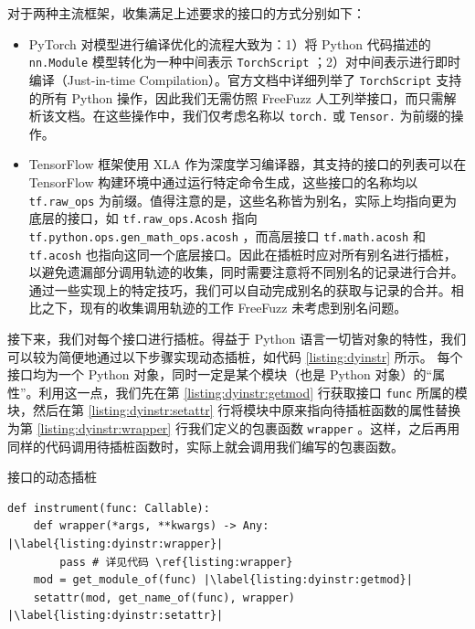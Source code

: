 对于两种主流框架，收集满足上述要求的接口的方式分别如下：
\begin{itemize}
    \item PyTorch 对模型进行编译优化的流程大致为：1）将 Python 代码描述的 \texttt{nn.Module} 模型转化为一种中间表示 \texttt{TorchScript} ；2）对中间表示进行即时编译（Just-in-time Compilation）。官方文档\cite{torch_ops_doc}中详细列举了 \texttt{TorchScript} 支持的所有 Python 操作，因此我们无需仿照 FreeFuzz\cite{freefuzz} 人工列举接口，而只需解析该文档。在这些操作中，我们仅考虑名称以 \texttt{torch.} 或 \texttt{Tensor.} 为前缀的操作。
    
    \item TensorFlow 框架使用 XLA 作为深度学习编译器，其支持的接口的列表可以在 TensorFlow 构建环境中通过运行特定命令生成\cite{tf_ops_doc}，这些接口的名称均以 \texttt{tf.raw\_ops} 为前缀。值得注意的是，这些名称皆为别名，实际上均指向更为底层的接口，如 \texttt{tf.raw\_ops.Acosh} 指向 \texttt{tf.python.ops.gen\_math\_ops.acosh} ，而高层接口 \texttt{tf.math.acosh} 和 \texttt{tf.acosh} 也指向这同一个底层接口。因此在插桩时应对所有别名进行插桩，以避免遗漏部分调用轨迹的收集，同时需要注意将不同别名的记录进行合并。通过一些实现上的特定技巧，我们可以自动完成别名的获取与记录的合并。相比之下，现有的收集调用轨迹的工作 FreeFuzz\cite{freefuzz} 未考虑到别名问题。
\end{itemize}

接下来，我们对每个接口进行插桩。得益于 Python 语言一切皆对象的特性，我们可以较为简便地通过以下步骤实现动态插桩，如代码 \ref{listing:dyinstr} 所示。
每个接口均为一个 Python 对象，同时一定是某个模块（也是 Python 对象）的“属性”。利用这一点，我们先在第 \ref{listing:dyinstr:getmod} 行获取接口 \texttt{func} 所属的模块，然后在第 \ref{listing:dyinstr:setattr} 行将模块中原来指向待插桩函数的属性替换为第 \ref{listing:dyinstr:wrapper} 行我们定义的包裹函数 \texttt{wrapper} 。这样，之后再用同样的代码调用待插桩函数时，实际上就会调用我们编写的包裹函数。

\begin{listing}[]
    \caption{接口的动态插桩}
    \label{listing:dyinstr}
\begin{verbatim}
def instrument(func: Callable):
    def wrapper(*args, **kwargs) -> Any: |\label{listing:dyinstr:wrapper}|
        pass # 详见代码 \ref{listing:wrapper}
    mod = get_module_of(func) |\label{listing:dyinstr:getmod}|
    setattr(mod, get_name_of(func), wrapper) |\label{listing:dyinstr:setattr}|
\end{verbatim}
\end{listing}

